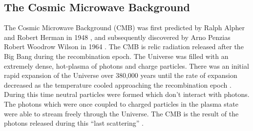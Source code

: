 \subsection{The Cosmic Microwave Background}\label{sec:DMOverview/CMB}
The Cosmic Microwave Background (CMB) was first predicted by Ralph Alpher and Robert Herman in 1948 \cite{CMBprediction}, and subsequently discovered by Arno Penzias Robert Woodrow Wilson in 1964 \cite{CMBDisco}. The CMB is relic radiation released after the Big Bang during the recombination epoch. The Universe was filled with an extremely dense, hot-plasma of photons and charge particles. There was an initial rapid expansion of the Universe over 380,000 years until the rate of expansion decreased as the temperature cooled approaching the recombination epoch \cite{DMPrimer}. During this time neutral particles were formed which don't interact with photons. The photons which were once coupled to charged particles in the plasma state were able to stream freely through the Universe. The CMB is the result of the photons released during this ``last scattering'' \cite{Cirelli:2024ssz}.

